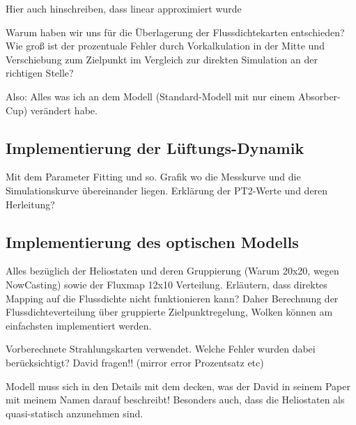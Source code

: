 Hier auch hinschreiben, dass linear approximiert wurde

Warum haben wir uns für die Überlagerung der Flussdichtekarten entschieden?
Wie groß ist der prozentuale Fehler durch Vorkalkulation in der Mitte und Verschiebung zum Zielpunkt im Vergleich zur direkten Simulation an der richtigen Stelle?

Also: Alles was ich an dem Modell (Standard-Modell mit nur einem Absorber-Cup) verändert habe.

\subsection{Implementierung der Lüftungs-Dynamik} \label{subsec_ImplementierungFan}
Mit dem Parameter Fitting und so.
Grafik wo die Messkurve und die Simulationskurve übereinander liegen.
Erklärung der PT2-Werte und deren Herleitung?

\subsection{Implementierung des optischen Modells} \label{subsec_Modells}
Alles bezüglich der Heliostaten und deren Gruppierung (Warum 20x20, wegen NowCasting) sowie der Fluxmap 12x10 Verteilung.
Erläutern, dass direktes Mapping auf die Flussdichte nicht funktionieren kann?
Daher Berechnung der Flussdichteverteilung über gruppierte Zielpunktregelung, Wolken können am einfachsten implementiert werden.

Vorberechnete Strahlungskarten verwendet.
Welche Fehler wurden dabei berücksichtigt? David fragen!! (mirror error Prozentsatz etc)

Modell muss sich in den Details mit dem decken, was der David in seinem Paper mit meinem Namen darauf beschreibt!
Besonders auch, dass die Heliostaten als quasi-statisch anzunehmen sind.
